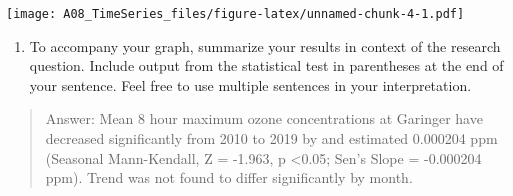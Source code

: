 \documentclass[
]{article}
\providecommand{\tightlist}{%
  \setlength{\itemsep}{0pt}\setlength{\parskip}{0pt}}
\begin{document}
\texttt{[image: A08\_TimeSeries\_files/figure-latex/unnamed-chunk-4-1.pdf]}

\begin{enumerate}
\def\labelenumi{\arabic{enumi}.}
\setcounter{enumi}{13}
\tightlist
\item
  To accompany your graph, summarize your results in context of the
  research question. Include output from the statistical test in
  parentheses at the end of your sentence. Feel free to use multiple
  sentences in your interpretation.
\end{enumerate}

\begin{quote}
Answer: Mean 8 hour maximum ozone concentrations at Garinger have
decreased significantly from 2010 to 2019 by and estimated 0.000204 ppm
(Seasonal Mann-Kendall, Z = -1.963, p \textless0.05; Sen's Slope =
-0.000204 ppm). Trend was not found to differ significantly by month.
\end{quote}
\end{document}
